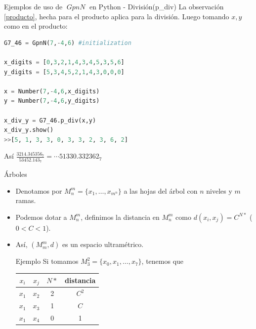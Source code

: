 \documentclass{beamer}
\theoremstyle{definition}
\numberwithin{equation}{section}
\DeclareMathOperator{\gpn}{\mathit{{GpnN}}}
\begin{document}
\begin{frame}[fragile]{Ejemplos de uso de $\gpn$ en Python - División(p\_div) }
La observación \ref{producto}, hecha para el producto aplica para la división. Luego tomando $x,y$ como en el producto:

\begin{lstlisting}[language = Python, caption = división de números en $\mathit{G7\_46}$,basicstyle=\tiny]
G7_46 = GpnN(7,-4,6) #initialization

x_digits = [0,3,2,1,4,3,4,5,3,5,6]
y_digits = [5,3,4,5,2,1,4,3,0,0,0]

x = Number(7,-4,6,x_digits)
y = Number(7,-4,6,y_digits)

x_div_y = G7_46.p_div(x,y)
x_div_y.show()
>>[5, 1, 3, 3, 0, 3, 3, 2, 3, 6, 2]
\end{lstlisting}
Así $\frac{3214.345356_7}{53452.143_7}=\cdots51330.332362_7$
\end{frame}



\begin{frame}[fragile]{Árboles}
\begin{itemize}
	\item Denotamos por $M_n^m=\{x_1, \dots, x_{m^n}\}$ a las hojas del árbol con $n$ niveles y $m$ ramas.
	\item Podemos dotar a $M_n^m$, definimos la distancia en $M_n^m$ como $d   (x_i,x_j)=C^{N*}$ ($0<C<1$).
	\item Así, $   (M_m^m,d)$ es un espacio ultramétrico.
	\begin{exampleblock}{Ejemplo}
		Si tomamos $M_3^2=\{x_0, x_1,\dots, x_7\}$, tenemos que 
		\begin{center}
			\begin{tabular}{||c c c c||} 
				\hline
				$x_i$ & $x_j$ & $N*$ & distancia \\ [0.5ex] 
				\hline\hline
				$x_1$ & $x_2$ & 2 & $C^2$ \\ 
				\hline
				$x_1$ & $x_3$ &1 & $C$ \\
				\hline
				$x_1$ & $x_4$ & 0 & 1 \\ 
				\hline
			\end{tabular}
		\end{center}
	\end{exampleblock}
\end{itemize}	

\end{frame}
\end{document}
